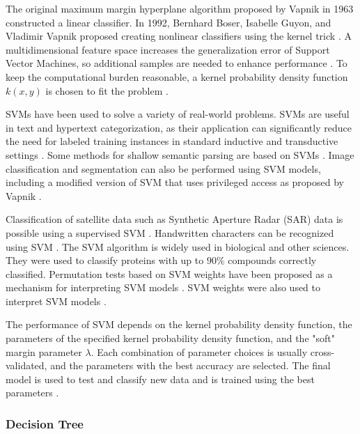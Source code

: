 \documentclass[sn-mathphys-num]{sn-jnl}%
\begin{document}
The original maximum margin hyperplane algorithm proposed by Vapnik in 1963 constructed a linear classifier. In 1992, Bernhard Boser, Isabelle Guyon, and Vladimir Vapnik proposed creating nonlinear classifiers using the kernel trick \cite{Boser1992, Aizerman1964}. A multidimensional feature space increases the generalization error of Support Vector Machines, so additional samples are needed to enhance performance \cite{Jin2012}. To keep the computational burden reasonable, a kernel probability density function $k(x, y)$ is chosen to fit the problem \cite{Press2007}.

SVMs have been used to solve a variety of real-world problems. SVMs are useful in text and hypertext categorization, as their application can significantly reduce the need for labeled training instances in standard inductive and transductive settings \cite{Joachims1998}. Some methods for shallow semantic parsing are based on SVMs \cite{Pradhan2004}. Image classification and segmentation can also be performed using SVM models, including a modified version of SVM that uses privileged access as proposed by Vapnik \cite{Laurent2014, Barghout2015}.

Classification of satellite data such as Synthetic Aperture Radar (SAR) data is possible using a supervised SVM \cite{Maity2016}. Handwritten characters can be recognized using SVM \cite{Decoste2002, Maitra2015}. The SVM algorithm is widely used in biological and other sciences. They were used to classify proteins with up to $90\%$ compounds correctly classified. Permutation tests based on SVM weights have been proposed as a mechanism for interpreting SVM models \cite{Gaonkar2013, Cuingnet2011}. SVM weights were also used to interpret SVM models \cite{Statnikov2006}.

The performance of SVM depends on the kernel probability density function, the parameters of the specified kernel probability density function, and the "soft" margin parameter $\lambda$. Each combination of parameter choices is usually cross-validated, and the parameters with the best accuracy are selected. The final model is used to test and classify new data and is trained using the best parameters \cite{Hsu2003}.

\subsubsection{Decision Tree}
\end{document}
